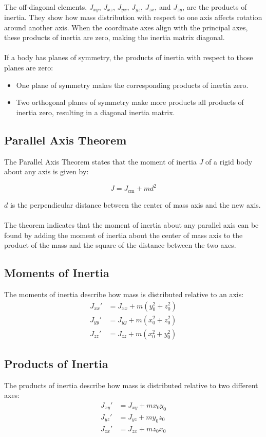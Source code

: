 \\
The off-diagonal elements, \( J_{xy} \), \( J_{xz} \), \( J_{yx} \), \( J_{yz} \), \( J_{zx} \), and \( J_{zy} \), are the products of inertia. They show how mass distribution with respect to one axis affects rotation around another axis. When the coordinate axes align with the principal axes, these products of inertia are zero, making the inertia matrix diagonal.
\\
\\
If a body has planes of symmetry, the products of inertia with respect to those planes are zero:
\begin{itemize}
    \item One plane of symmetry makes the corresponding products of inertia zero.
    \item Two orthogonal planes of symmetry make more products all products of inertia zero, resulting in a diagonal inertia matrix.
\end{itemize}

\subsection{Parallel Axis Theorem}
The Parallel Axis Theorem states that the moment of inertia \(J\) of a rigid body about any axis is given by:

\[
J = J_{\text{cm}} + m d^2
\]

$d$ is the perpendicular distance between the center of mass axis and the new axis.
\\
\\
The theorem indicates that the moment of inertia about any parallel axis can be found by adding the moment of inertia about the center of mass axis to the product of the mass and the square of the distance between the two axes.


\subsection{Moments of Inertia}
The moments of inertia describe how mass is distributed relative to an axis:
\begin{align*}
    J_{xx}' &= J_{xx} + m (y_0^2 + z_0^2) \\
    J_{yy}' &= J_{yy} + m (x_0^2 + z_0^2) \\
    J_{zz}' &= J_{zz} + m (x_0^2 + y_0^2)
\end{align*}

\subsection{Products of Inertia}
The products of inertia describe how mass is distributed relative to two different axes:
\begin{align*}
    J_{xy}' &= J_{xy} + m x_0 y_0 \\
    J_{yz}' &= J_{yz} + m y_0 z_0 \\
    J_{zx}' &= J_{zx} + m z_0 x_0
\end{align*}

